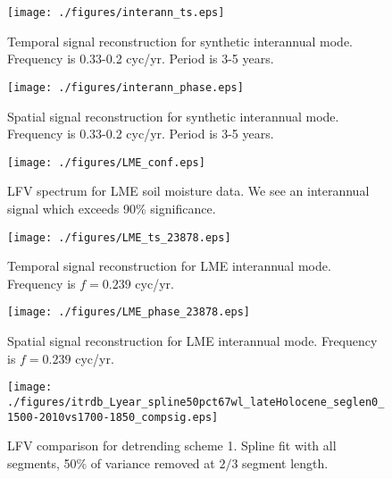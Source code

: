 \documentclass[phd,tocprelim]{cornell}
\begin{document}
\begin{figure}[!tbp]
\centering
\begin{minipage}[b]{0.45\textwidth}
\texttt{[image: ./figures/interann\_ts.eps]}
\caption{Temporal signal reconstruction for synthetic interannual mode. Frequency is 0.33-0.2 cyc/yr. Period is 3-5 years.}
\label{interann:ts}
\end{minipage}
\hfill
\begin{minipage}[b]{0.45\textwidth}
\texttt{[image: ./figures/interann\_phase.eps]}
\caption{Spatial signal reconstruction for synthetic interannual mode. Frequency is 0.33-0.2 cyc/yr. Period is 3-5 years.}
\label{interann:phase}
\end{minipage}
\end{figure}

\begin{figure}[!tbp]
\centering
\texttt{[image: ./figures/LME\_conf.eps]}
\caption{LFV spectrum for LME soil moisture data. We see an interannual signal which exceeds 90\% significance.}
\label{lme:lfv}
\end{figure}

\begin{figure}[!tbp]
\centering
\begin{minipage}[b]{0.45\textwidth}
\texttt{[image: ./figures/LME\_ts\_23878.eps]}
\caption{Temporal signal reconstruction for LME interannual mode. Frequency is $f=0.239$ cyc/yr.}
\label{lme:ts}
\end{minipage}
\hfill
\begin{minipage}[b]{0.45\textwidth}
\texttt{[image: ./figures/LME\_phase\_23878.eps]}
\caption{Spatial signal reconstruction for LME interannual mode. Frequency is $f=0.239$ cyc/yr.}
\label{lme:phase}
\end{minipage}
\end{figure}


\begin{figure}[!tbp]
\centering
\texttt{[image: ./figures/itrdb\_Lyear\_spline50pct67wl\_lateHolocene\_seglen0\_1500-2010vs1700-1850\_compsig.eps]}

\noindent{}

\caption{LFV comparison for detrending scheme 1. Spline fit with all segments, 50\% of variance removed at $2/3$ segment length.}

\label{compsig1}
\end{figure}
\end{document}
